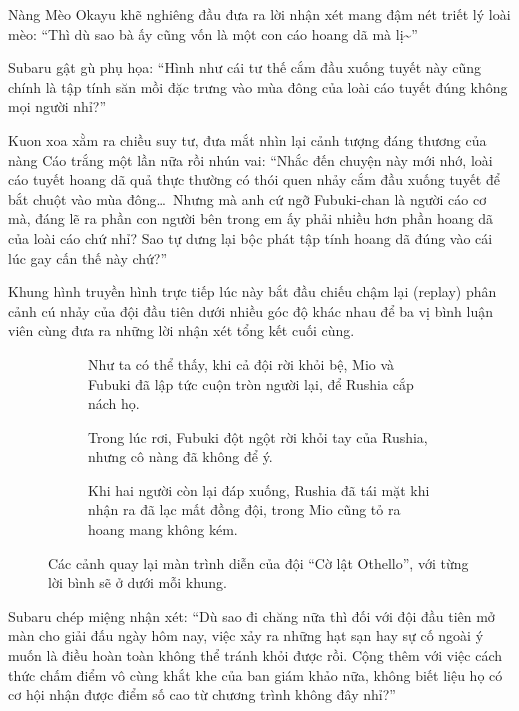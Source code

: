 \documentclass[../main.tex]{subfiles}
\begin{document}
Nàng Mèo Okayu khẽ nghiêng đầu đưa ra lời nhận xét mang đậm nét triết lý loài mèo: ``Thì dù sao bà ấy cũng vốn là một con cáo hoang dã mà lị\~{}''

Subaru gật gù phụ họa: ``Hình như cái tư thế cắm đầu xuống tuyết này cũng chính là tập tính săn mồi đặc trưng vào mùa đông của loài cáo tuyết đúng không mọi người nhỉ?''

Kuon xoa xằm ra chiều suy tư, đưa mắt nhìn lại cảnh tượng đáng thương của nàng Cáo trắng một lần nữa rồi nhún vai: ``Nhắc đến chuyện này mới nhớ, loài cáo tuyết hoang dã quả thực thường có thói quen nhảy cắm đầu xuống tuyết để bắt chuột vào mùa đông\dots\ Nhưng mà anh cứ ngỡ Fubuki-chan là người cáo cơ mà, đáng lẽ ra phần con người bên trong em ấy phải nhiều hơn phần hoang dã của loài cáo chứ nhỉ? Sao tự dưng lại bộc phát tập tính hoang dã đúng vào cái lúc gay cấn thế này chứ?''

Khung hình truyền hình trực tiếp lúc này bắt đầu chiếu chậm lại (replay) phân cảnh cú nhảy của đội đầu tiên dưới nhiều góc độ khác nhau để ba vị bình luận viên cùng đưa ra những lời nhận xét tổng kết cuối cùng.

\begin{figure}[H]
  \centering
  \begin{subfigure}[t]{0.45\textwidth}
    \centering
    \caption{Như ta có thể thấy, khi cả đội rời khỏi bệ, Mio và Fubuki đã lập tức cuộn tròn người lại, để Rushia cắp nách họ.}
  \end{subfigure}
  \quad
  \begin{subfigure}[t]{0.45\textwidth}
    \centering
    \caption{Trong lúc rơi, Fubuki đột ngột rời khỏi tay của Rushia, nhưng cô nàng đã không để ý.}
  \end{subfigure}
  \quad
  \begin{subfigure}[t]{0.45\textwidth}
    \centering
    \caption{Khi hai người còn lại đáp xuống, Rushia đã tái mặt khi nhận ra đã lạc mất đồng đội, trong Mio cũng tỏ ra hoang mang không kém.}
  \end{subfigure}
  \caption{Các cảnh quay lại màn trình diễn của đội ``Cờ lật Othello'', với từng lời bình sẽ ở dưới mỗi khung.}
\end{figure}

Subaru chép miệng nhận xét: ``Dù sao đi chăng nữa thì đối với đội đầu tiên mở màn cho giải đấu ngày hôm nay, việc xảy ra những hạt sạn hay sự cố ngoài ý muốn là điều hoàn toàn không thể tránh khỏi được rồi. Cộng thêm với việc cách thức chấm điểm vô cùng khắt khe của ban giám khảo nữa, không biết liệu họ có cơ hội nhận được điểm số cao từ chương trình không đây nhỉ?''
\end{document}
